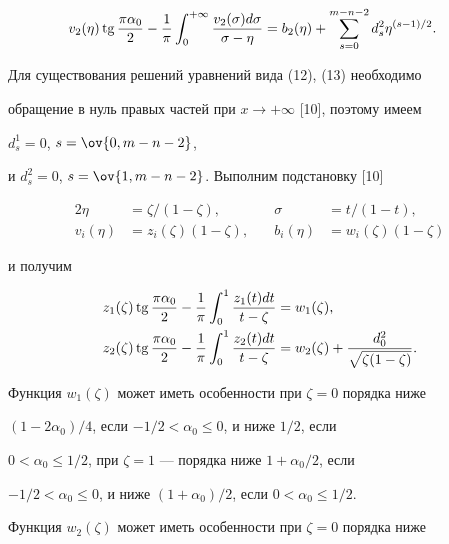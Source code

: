 \begin{pf}
\begin{align}
v_2(\eta)\tg\frac{\pi\alpha_0}{2}-\frac{1}{\pi} 


\int^{+\infty}_0\frac{v_2(\sigma)d\sigma}{\sigma-\eta} 


&=b_2(\eta)+\sum^{m-n-2}_{s=0}d^2_s\eta^{(s-1)/2}.


\end{align} 


 


Для существования решений уравнений вида (12), (13) необходимо 


обращение в нуль правых частей при $x\to+\infty$ [10], поэтому имеем 


$d^1_s=0$, $s=\ov{0,m-n-2}$, 


и $d^2_s=0$, $s=\ov{1,m-n-2}$. Выполним подстановку [10] 


\begin{alignat*}{2} 


\eta&=\zeta/(1-\zeta),&\quad \sigma&=t/(1-t),\\ 


v_i(\eta)&=z_i(\zeta)(1-\zeta),&\quad 


b_i(\eta)&=w_i(\zeta)(1-\zeta) 


\end{alignat*} 


и получим 


\begin{align} 


z_1(\zeta)\tg\frac{\pi\alpha_0}{2}-\frac{1}{\pi}\int^1_0 


\frac{z_1(t)dt}{t-\zeta}&=w_1(\zeta), \\ 


% 


z_2(\zeta)\tg\frac{\pi\alpha_0}{2}-\frac{1}{\pi}\int^1_0 


\frac{z_2(t)dt}{t-\zeta}&=w_2(\zeta)+ 


\frac{d^2_0}{\sqrt{\zeta(1-\zeta)}}.


\end{align} 


Функция $w_1(\zeta)$ может иметь особенности при $\zeta=0$ порядка ниже 


$(1-2\alpha_0)/4$, если $-1/2<\alpha_0\le0$, и ниже $1/2$, если 


$0<\alpha_0\le1/2$, при $\zeta=1$ --- порядка ниже $1+\alpha_0/2$, если 


$-1/2<\alpha_0\le0$, и ниже $(1+\alpha_0)/2$, если $0<\alpha_0\le1/2$. 


Функция $w_2(\zeta)$ может иметь особенности при $\zeta=0$ порядка ниже 



\end{pf}
